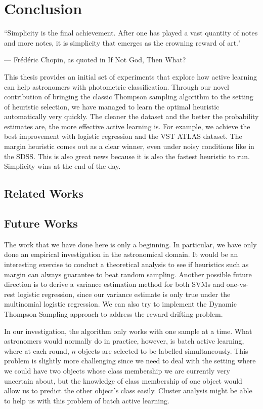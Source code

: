 
\chapter{Conclusion}
\label{cha:conclusion}


\epigraph{``Simplicity is the final achievement. After one has played a vast quantity of notes and more notes, it is simplicity that emerges as the crowning reward of art."}{--- \textup{Fr\'ed\'eric Chopin, as quoted in} If Not God, Then What?}


This thesis provides an initial set of experiments that explore how active learning can help astronomers with photometric classification. Through our novel contribution of bringing
the classic Thompson sampling algorithm to the setting of heuristic selection, we have managed to
learn the optimal heuristic automatically very quickly. The cleaner the dataset and 
the better the probability estimates are, the more effective active learning is. For example,
we achieve the best improvement with logistic regression and the VST ATLAS dataset. The margin
heuristic comes out as a clear winner, even under noisy conditions like in the SDSS. This
is also great news because it is also the fastest heuristic to run. Simplicity wins at the end of the day.

\section{Related Works}



\section{Future Works}
The work that we have done here is only a beginning. In particular, we have only done an empirical
investigation in the astronomical domain. It would be an interesting exercise to conduct a
theoretical analysis to see if heuristics such as margin can always guarantee to beat random sampling.
Another possible future direction is to derive a variance estimation method for both SVMs and
one-vs-rest logistic regression, since our variance estimate is only true under the multinomial logistic regression. We can also try to implement the Dynamic Thompson Sampling approach to address
the reward drifting problem.

In our investigation, the algorithm only works with one sample at a time. What astronomers would
normally do in practice, however, is batch active learning, where at each round, $n$ objects are selected to be labelled simultaneously. This problem is slightly more challenging since we need to deal with the setting where we could have two objects whose class membership we are currently very uncertain about, but the knowledge of class membership of one object would allow us to predict the other object's class easily. 
Cluster analysis might be able to help us with this problem of batch active learning.


